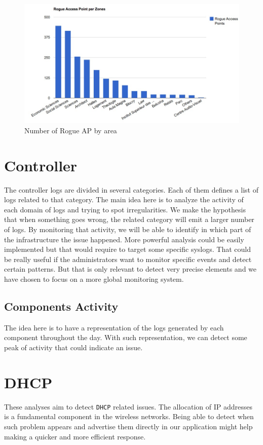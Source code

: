 \begin{figure}[H]
   \includegraphics[width=\textwidth]{Pictures/chapter5/rogue-ap.jpg}
   \caption{Number of Rogue AP by area}
\end{figure}


\section{Controller}
The controller logs are divided in several categories. Each of them defines a list of logs related to that category. The main idea here is to analyze the activity of each domain of logs and trying to spot irregularities. We make the hypothesis that when something goes wrong, the related category will emit a larger number of logs. By monitoring that activity, we will be able to identify in which part of the infrastructure the issue happened. More powerful analysis could be easily implemented but that would require to target some specific syslogs. That could be really useful if the administrators want to monitor specific events and detect certain patterns. But that is only relevant to detect very precise elements and we have chosen to focus on a more global monitoring system.

\subsection{Components Activity}
The idea here is to have a representation of the logs generated by each component throughout the day. With such representation, we can detect some peak of activity that could indicate an issue.


\section{DHCP}
These analyses aim to detect \texttt{DHCP} related issues. The allocation of IP addresses is a fundamental component in the wireless networks. Being able to detect when such problem appears and advertise them directly in our application might help making a quicker and more efficient response.

